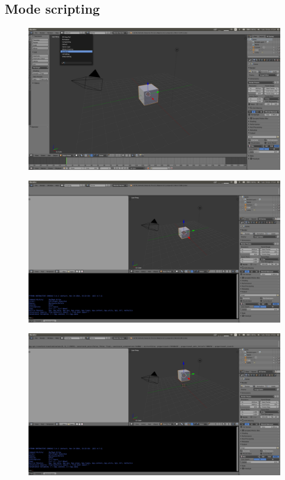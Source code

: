 \documentclass[11pt,usenames,dvipsnames]{beamer}
\begin{document}
\subsection{Mode scripting}
\begin{frame}
  \begin{figure}
    \includegraphics[scale=0.12]{blender-ui-menu.png}
  \end{figure}
\end{frame}

\begin{frame}
  \begin{figure}
    \includegraphics[scale=0.12]{blender-ui-scripting.png}
  \end{figure}
\end{frame}

\begin{frame}
  \begin{figure}
    \includegraphics[scale=0.12]{blender-ui-actionlog.png}
  \end{figure}
\end{frame}
\end{document}
